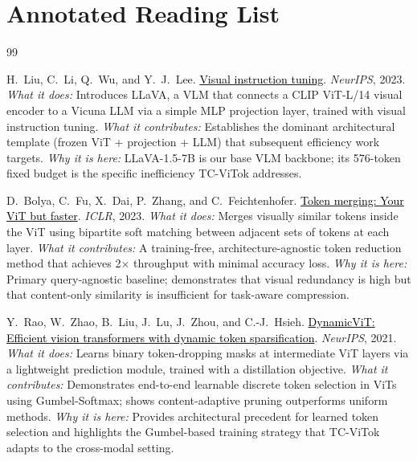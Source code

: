 \documentclass[11pt,twocolumn]{article}
\newcommand{\paperhref}[2]{\href{#1}{\textcolor{black}{#2}}}
\begin{document}
\section{Annotated Reading List}
\label{sec:readings}

\begin{thebibliography}{99}

H.~Liu, C.~Li, Q.~Wu, and Y.~J.~Lee.
\newblock \paperhref{https://arxiv.org/abs/2304.08485}{Visual instruction tuning}.
\newblock \textit{NeurIPS}, 2023.
\newblock \textit{What it does:} Introduces LLaVA, a VLM that connects a CLIP ViT-L/14 visual encoder to a Vicuna LLM via a simple MLP projection layer, trained with visual instruction tuning.
\newblock \textit{What it contributes:} Establishes the dominant architectural template (frozen ViT + projection + LLM) that subsequent efficiency work targets.
\newblock \textit{Why it is here:} LLaVA-1.5-7B is our base VLM backbone; its 576-token fixed budget is the specific inefficiency TC-ViTok addresses.

D.~Bolya, C.~Fu, X.~Dai, P.~Zhang, and C.~Feichtenhofer.
\newblock \paperhref{https://arxiv.org/abs/2210.09461}{Token merging: Your ViT but faster}.
\newblock \textit{ICLR}, 2023.
\newblock \textit{What it does:} Merges visually similar tokens inside the ViT using bipartite soft matching between adjacent sets of tokens at each layer.
\newblock \textit{What it contributes:} A training-free, architecture-agnostic token reduction method that achieves 2$\times$ throughput with minimal accuracy loss.
\newblock \textit{Why it is here:} Primary query-agnostic baseline; demonstrates that visual redundancy is high but that content-only similarity is insufficient for task-aware compression.

Y.~Rao, W.~Zhao, B.~Liu, J.~Lu, J.~Zhou, and C.-J.~Hsieh.
\newblock \paperhref{https://arxiv.org/abs/2106.02034}{DynamicViT: Efficient vision transformers with dynamic token sparsification}.
\newblock \textit{NeurIPS}, 2021.
\newblock \textit{What it does:} Learns binary token-dropping masks at intermediate ViT layers via a lightweight prediction module, trained with a distillation objective.
\newblock \textit{What it contributes:} Demonstrates end-to-end learnable discrete token selection in ViTs using Gumbel-Softmax; shows content-adaptive pruning outperforms uniform methods.
\newblock \textit{Why it is here:} Provides architectural precedent for learned token selection and highlights the Gumbel-based training strategy that TC-ViTok adapts to the cross-modal setting.


\end{thebibliography}
\end{document}
